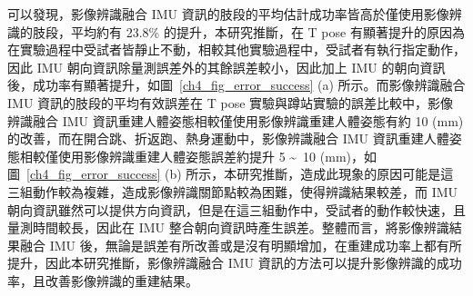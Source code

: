 可以發現，影像辨識融合 IMU 資訊的肢段的平均估計成功率皆高於僅使用影像辨識的肢段，平均約有 23.8\% 的提升，本研究推斷，在 T pose 有顯著提升的原因為在實驗過程中受試者皆靜止不動，相較其他實驗過程中，受試者有執行指定動作，因此 IMU 朝向資訊除量測誤差外的其餘誤差較小，因此加上 IMU 的朝向資訊後，成功率有顯著提升，如圖~\ref{ch4_fig_error_success} (a) 所示。而影像辨識融合 IMU 資訊的肢段的平均有效誤差在 T pose 實驗與蹲站實驗的誤差比較中，影像辨識融合 IMU 資訊重建人體姿態相較僅使用影像辨識重建人體姿態有約 10 (mm) 的改善，而在開合跳、折返跑、熱身運動中，影像辨識融合 IMU 資訊重建人體姿態相較僅使用影像辨識重建人體姿態誤差約提升 5 \textasciitilde\ 10 (mm)，如圖~\ref{ch4_fig_error_success} (b) 所示，本研究推斷，造成此現象的原因可能是這三組動作較為複雜，造成影像辨識關節點較為困難，使得辨識結果較差，而 IMU 朝向資訊雖然可以提供方向資訊，但是在這三組動作中，受試者的動作較快速，且量測時間較長，因此在 IMU 整合朝向資訊時產生誤差。整體而言，將影像辨識結果融合 IMU 後，無論是誤差有所改善或是沒有明顯增加，在重建成功率上都有所提升，因此本研究推斷，影像辨識融合 IMU 資訊的方法可以提升影像辨識的成功率，且改善影像辨識的重建結果。

